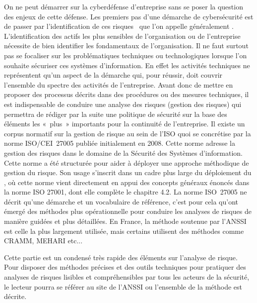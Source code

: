 On ne peut démarrer sur la cyberdéfense d’entreprise sans se poser la question des enjeux de cette défense. Les premiers pas d’une démarche de cybersécurité est de passer  par l’identification de ces risques  que l’on appelle généralement .
L’identification des actifs les plus sensibles de l’organisation ou de l’entreprise nécessite de bien identifier les fondamentaux de l’organisation.
Il ne faut surtout pas se focaliser sur les problématiques techniques ou technologiques lorsque l’on souhaite sécuriser ces systèmes d’information. En effet les activités techniques   ne représentent qu’un aspect de la  démarche qui, pour réussir, doit couvrir l’ensemble du spectre des  activités de l'entreprise.
Avant donc de mettre en proposer des processus décrits dans des procédures ou des mesures techniques, il est indispensable de conduire une analyse des risques (gestion des risques) qui permettra de rédiger par la suite une politique de sécurité sur la base des éléments les « plus » importants pour la continuité de l’entreprise.
Il existe un corpus normatif sur la gestion de risque au sein de l’ISO quoi se concrétise par la norme ISO/CEI~27005 publiée initialement en 2008. Cette norme adresse la gestion des risques dans le domaine de la Sécurité des Systèmes d'information.
Cette norme a été structurée pour aider à déployer une approche méthodique de gestion du risque. Son usage s’inscrit dans un cadre plus large du déploiement du ,  où cette norme vient directement en appui des concepts généraux énoncés dans la norme ISO 27001, dont elle complète le chapitre 4.2.
La norme ISO~27005 ne décrit qu'une démarche et un vocabulaire de référence, c’est pour cela qu’ont émergé des méthodes plus opérationnelle pour conduire les analyses de risques de manière guidées et plus détaillées. En France, la méthode  soutenue par l’ANSSI est celle la plus largement utilisée, mais certains utilisent des méthodes comme CRAMM, MEHARI etc...

Cette partie est un condensé très rapide des éléments sur l'analyse de risque. Pour disposer des méthodes précises et des outils techniques pour pratiquer des analyses de risques lisibles et compréhensibles par tous les acteurs de la sécurité, le lecteur pourra se référer au site de l’ANSSI ou l’ensemble de la méthode  est décrite.\\

